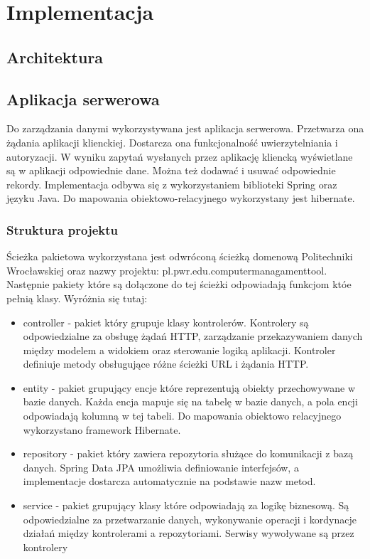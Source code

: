 \chapter{Implementacja}

\section{Architektura}






\section{Aplikacja serwerowa}
Do zarządzania danymi wykorzystywana jest aplikacja serwerowa. Przetwarza ona żądania aplikacji klienckiej. Dostarcza ona funkcjonalność uwierzytelniania i autoryzacji. W wyniku zapytań wysłanych przez aplikację kliencką wyświetlane są w aplikacji odpowiednie dane. Można też dodawać i usuwać odpowiednie rekordy. Implementacja odbywa się z wykorzystaniem biblioteki Spring oraz języku Java. Do mapowania obiektowo-relacyjnego wykorzystany jest hibernate.

\subsection{Struktura projektu}
Ścieżka pakietowa wykorzystana jest odwróconą ścieżką domenową Politechniki Wrocławskiej oraz nazwy projektu: pl.pwr.edu.computermanagamenttool. Następnie pakiety które są dołączone do tej ścieżki odpowiadają funkcjom któe pełnią klasy. Wyróżnia się tutaj:

\begin{itemize}[label=•]
\item controller - pakiet który grupuje klasy kontrolerów. Kontrolery są odpowiedzialne za obsługę żądań HTTP, zarządzanie przekazywaniem danych między modelem a widokiem oraz sterowanie logiką aplikacji. Kontroler definiuje metody obsługujące różne ścieżki URL i żądania HTTP.
\item entity - pakiet grupujący encje które reprezentują obiekty przechowywane w bazie danych. Każda encja mapuje się na tabelę w bazie danych, a pola encji odpowiadają kolumną w tej tabeli. Do mapowania obiektowo relacyjnego wykorzystano framework Hibernate.
\item repository - pakiet który zawiera repozytoria służące do komunikacji z bazą danych. Spring Data JPA umożliwia definiowanie interfejsów, a implementacje dostarcza automatycznie na podstawie nazw metod.
\item service - pakiet grupujący klasy które odpowiadają za logikę biznesową. Są odpowiedzialne za przetwarzanie danych, wykonywanie operacji i kordynacje działań między kontrolerami a repozytoriami. Serwisy wywoływane są przez kontrolery
\end{itemize}


